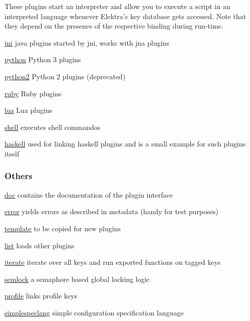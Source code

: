 These plugins start an interpreter and allow you to execute a script in an interpreted language whenever Elektra’s key database gets accessed. Note that they depend on the presence of the respective binding during run-\/time.


\begin{DoxyItemize}
\item \hyperlink{md_src_plugins_jni_README_src_plugins_jni_README_md}{jni} java plugins started by jni, works with jna plugins
\item \hyperlink{md_src_plugins_python_README_src_plugins_python_README_md}{python} Python 3 plugins
\item \hyperlink{md_src_plugins_python2_README_src_plugins_python2_README_md}{python2} Python 2 plugins (deprecated)
\item \hyperlink{md_src_plugins_ruby_README_src_plugins_ruby_README_md}{ruby} Ruby plugins
\item \hyperlink{md_src_plugins_lua_README_src_plugins_lua_README_md}{lua} Lua plugins
\item \hyperlink{md_src_plugins_shell_README_src_plugins_shell_README_md}{shell} executes shell commandos
\item \hyperlink{md_src_plugins_haskell_README_src_plugins_haskell_README_md}{haskell} used for linking haskell plugins and is a small example for such plugins itself
\end{DoxyItemize}

\subsubsection*{Others}


\begin{DoxyItemize}
\item \hyperlink{md_src_plugins_doc_README_src_plugins_doc_README_md}{doc} contains the documentation of the plugin interface
\item \hyperlink{md_src_plugins_error_README_src_plugins_error_README_md}{error} yields errors as described in metadata (handy for test purposes)
\item \hyperlink{md_src_plugins_template_README_src_plugins_template_README_md}{template} to be copied for new plugins
\item \hyperlink{md_src_plugins_list_README_src_plugins_list_README_md}{list} loads other plugins
\item \hyperlink{md_src_plugins_iterate_README_src_plugins_iterate_README_md}{iterate} iterate over all keys and run exported functions on tagged keys
\item \hyperlink{md_src_plugins_semlock_README_src_plugins_semlock_README_md}{semlock} a semaphore based global locking logic
\item \hyperlink{md_src_plugins_profile_README_src_plugins_profile_README_md}{profile} links profile keys
\item \hyperlink{md_src_plugins_simplespeclang_README_src_plugins_simplespeclang_README_md}{simplespeclang} simple configuration specification language 
\end{DoxyItemize}